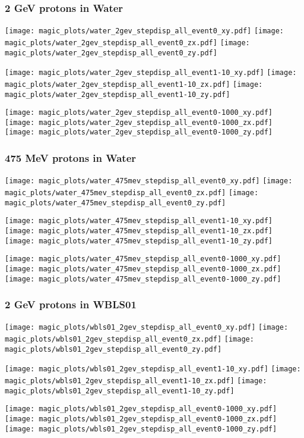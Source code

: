 \documentclass[xcolor=dvipsnames]{beamer}
\begin{document}
\begin{frame}[fragile]
  \frametitle{2 GeV protons in Water}
  \texttt{[image: magic\_plots/water\_2gev\_stepdisp\_all\_event0\_xy.pdf]}%
  \texttt{[image: magic\_plots/water\_2gev\_stepdisp\_all\_event0\_zx.pdf]}%
  \texttt{[image: magic\_plots/water\_2gev\_stepdisp\_all\_event0\_zy.pdf]}%

  \texttt{[image: magic\_plots/water\_2gev\_stepdisp\_all\_event1-10\_xy.pdf]}%
  \texttt{[image: magic\_plots/water\_2gev\_stepdisp\_all\_event1-10\_zx.pdf]}%
  \texttt{[image: magic\_plots/water\_2gev\_stepdisp\_all\_event1-10\_zy.pdf]}%

  \texttt{[image: magic\_plots/water\_2gev\_stepdisp\_all\_event0-1000\_xy.pdf]}%
  \texttt{[image: magic\_plots/water\_2gev\_stepdisp\_all\_event0-1000\_zx.pdf]}%
  \texttt{[image: magic\_plots/water\_2gev\_stepdisp\_all\_event0-1000\_zy.pdf]}%
\end{frame}
\begin{frame}[fragile]
  \frametitle{475 MeV protons in Water}
  \texttt{[image: magic\_plots/water\_475mev\_stepdisp\_all\_event0\_xy.pdf]}%
  \texttt{[image: magic\_plots/water\_475mev\_stepdisp\_all\_event0\_zx.pdf]}%
  \texttt{[image: magic\_plots/water\_475mev\_stepdisp\_all\_event0\_zy.pdf]}%

  \texttt{[image: magic\_plots/water\_475mev\_stepdisp\_all\_event1-10\_xy.pdf]}%
  \texttt{[image: magic\_plots/water\_475mev\_stepdisp\_all\_event1-10\_zx.pdf]}%
  \texttt{[image: magic\_plots/water\_475mev\_stepdisp\_all\_event1-10\_zy.pdf]}%

  \texttt{[image: magic\_plots/water\_475mev\_stepdisp\_all\_event0-1000\_xy.pdf]}%
  \texttt{[image: magic\_plots/water\_475mev\_stepdisp\_all\_event0-1000\_zx.pdf]}%
  \texttt{[image: magic\_plots/water\_475mev\_stepdisp\_all\_event0-1000\_zy.pdf]}%
\end{frame}
\begin{frame}[fragile]
  \frametitle{2 GeV protons in WBLS01}
  \texttt{[image: magic\_plots/wbls01\_2gev\_stepdisp\_all\_event0\_xy.pdf]}%
  \texttt{[image: magic\_plots/wbls01\_2gev\_stepdisp\_all\_event0\_zx.pdf]}%
  \texttt{[image: magic\_plots/wbls01\_2gev\_stepdisp\_all\_event0\_zy.pdf]}%

  \texttt{[image: magic\_plots/wbls01\_2gev\_stepdisp\_all\_event1-10\_xy.pdf]}%
  \texttt{[image: magic\_plots/wbls01\_2gev\_stepdisp\_all\_event1-10\_zx.pdf]}%
  \texttt{[image: magic\_plots/wbls01\_2gev\_stepdisp\_all\_event1-10\_zy.pdf]}%

  \texttt{[image: magic\_plots/wbls01\_2gev\_stepdisp\_all\_event0-1000\_xy.pdf]}%
  \texttt{[image: magic\_plots/wbls01\_2gev\_stepdisp\_all\_event0-1000\_zx.pdf]}%
  \texttt{[image: magic\_plots/wbls01\_2gev\_stepdisp\_all\_event0-1000\_zy.pdf]}%
\end{frame}
\end{document}
